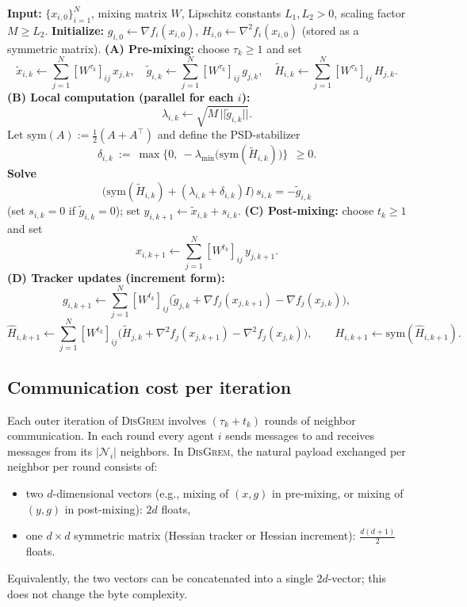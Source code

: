 \documentclass[11pt,a4paper]{article}
\def\norm#1{||#1||}%
\newcommand{\norm}[1]{\left\|#1\right\|}
\begin{document}
\begin{algorithm}[H]
	\caption{Decentralized Gradient--Regularized Newton (\textsc{DisGrem}, v3)}
	\label{alg:disgrem}
	\begin{algorithmic}[1]
		\State \textbf{Input:} $\{x_{i,0}\}_{i=1}^N$, mixing matrix $W$, Lipschitz constants $L_1,L_2>0$, scaling factor $M\ge L_2$.
		\State \textbf{Initialize:}
		$g_{i,0}\gets \nabla f_i(x_{i,0})$,
		$H_{i,0}\gets \nabla^2 f_i(x_{i,0})$ (stored as a symmetric matrix).
		\State \textbf{(A) Pre-mixing:} choose $\tau_k\ge 1$ and set
		\[
		\tilde x_{i,k}\gets \sum_{j=1}^N [W^{\tau_k}]_{ij}\,x_{j,k},\quad
		\tilde g_{i,k}\gets \sum_{j=1}^N [W^{\tau_k}]_{ij}\,g_{j,k},\quad
		\tilde H_{i,k}\gets \sum_{j=1}^N [W^{\tau_k}]_{ij}\,H_{j,k}.
		\]
		\State \textbf{(B) Local computation (parallel for each $i$):}
		\[
		\lambda_{i,k} \gets \sqrt{M\,\norm{\tilde g_{i,k}}}.
		\]
		\Statex\hspace{1.6em}Let $\mathrm{sym}(A):=\tfrac12(A+A^\top)$ and define the PSD-stabilizer
		\[
		\delta_{i,k}\ :=\ \max\Big\{0,\ -\lambda_{\min}\big(\mathrm{sym}(\tilde H_{i,k})\big)\Big\}\ \ \ge 0.
		\]
		\Statex\hspace{1.6em}\textbf{Solve}
		\[
		\big(\mathrm{sym}(\tilde H_{i,k})+(\lambda_{i,k}+\delta_{i,k})I\big)\,s_{i,k}=-\tilde g_{i,k}
		\]
		\Statex\hspace{1.6em}(set $s_{i,k}=0$ if $\tilde g_{i,k}=0$); set $y_{i,k+1}\gets \tilde x_{i,k}+s_{i,k}$.
		\State \textbf{(C) Post-mixing:} choose $t_k\ge 1$ and set
		\[
		x_{i,k+1}\gets \sum_{j=1}^N [W^{t_k}]_{ij}\,y_{j,k+1}.
		\]
		\State \textbf{(D) Tracker updates (increment form):}
		\[
		g_{i,k+1}\gets \sum_{j=1}^N [W^{t_k}]_{ij}\Big(\tilde g_{j,k}+\nabla f_j(x_{j,k+1})-\nabla f_j(x_{j,k})\Big),
		\]
		\[
		\widehat H_{i,k+1}\gets \sum_{j=1}^N [W^{t_k}]_{ij}\Big(\tilde H_{j,k}+\nabla^2 f_j(x_{j,k+1})-\nabla^2 f_j(x_{j,k})\Big),
		\qquad
		H_{i,k+1}\gets \mathrm{sym}(\widehat H_{i,k+1}).
		\]
		\EndFor
	\end{algorithmic}
\end{algorithm}
	
\subsection{Communication cost per iteration}\label{ssec:comm}

Each outer iteration of \textsc{DisGrem} involves $(\tau_k + t_k)$ rounds of neighbor communication.
In each round every agent $i$ sends messages to and receives messages from its $|\mathcal N_i|$ neighbors.
In \textsc{DisGrem}, the natural payload exchanged per neighbor per round consists of:
\begin{itemize}[leftmargin=1.2em,itemsep=1pt]
	\item two $d$-dimensional vectors (e.g., mixing of $(x,g)$ in pre-mixing, or mixing of $(y,g)$ in post-mixing): $2d$ floats,
	\item one $d\times d$ symmetric matrix (Hessian tracker or Hessian increment): $\tfrac{d(d+1)}{2}$ floats.
\end{itemize}
Equivalently, the two vectors can be concatenated into a single $2d$-vector; this does not change the byte complexity.
\end{document}

